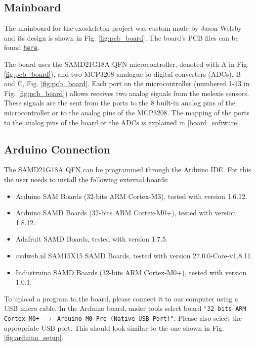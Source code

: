 \subsection{Mainboard}
The mainboard for the exoskeleton project was custom made by Jason Welsby 
and its design is shown in Fig. \ref{fig:pcb_board}.
The board's PCB files can be found
\texttt{\href{https://tinyurl.com/2h3ajxtt}{here}}.


The board uses the SAMD21G18A QFN microcontroller, denoted with A in Fig. \ref{fig:pcb_board}),
and two MCP3208 analogue to digital converters (ADCs), B and C, Fig. \ref{fig:pcb_board}.
Each port on the microcontroller (numbered 1-13 in Fig. \ref{fig:pcb_board}) 
allows receives two analog signals from the melexis sensors. These signals 
are the sent from the ports to the 8 built-in analog pins of the
microcontroller or to the analog pins of the MCP3208. The mapping 
of the ports to the analog pins of the board or the ADCs is explained in 
\ref{board_software}.

\subsection{Arduino Connection}
The SAMD21G18A QFN can be programmed through the Arduino IDE. For this 
the user needs to install the following external boards:
\begin{itemize}
    \item Arduino SAM Boards (32-bits ARM Cortex-M3), tested with version 1.6.12.
    \item Arduino SAMD Boards (32-bits ARM Cortex-M0+), tested with version 1.8.12.
    \item Adafruit SAMD Boards, tested with version 1.7.5.
    \item avdweb.nl SAM15X15 SAMD Boards, tested with version 27.0.0-Core-v1.8.11.
    \item Industruino SAMD Boards (32-bits ARM Cortex-M0+), tested with version 1.0.1.
\end{itemize}
To upload a program to the board, please connect it to our computer using 
a USB micro cable. In the Arduino board, under tools select board 
\texttt{"32-bits ARM Cortex-M0+ $\rightarrow$ Arduino M0 Pro (Native USB Port)"}.
Please also select the appropriate USB port. This should look similar 
to the one shown in Fig. \ref{fig:arduino_setup}.


